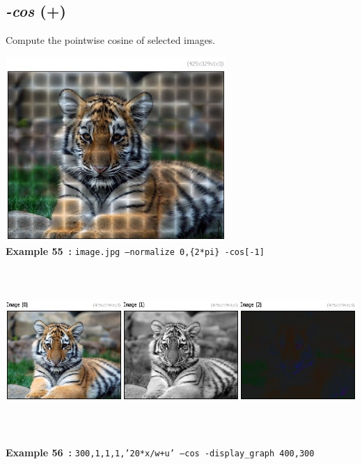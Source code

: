 \documentclass[a4paper,11pt,twoside]{book}
\begin{document}
\subsection{\emph{-cos} (+)}\vspace*{-0.5em}
Compute the pointwise cosine of selected images.
\begin{center}\includegraphics[keepaspectratio=true,height=7cm,width=\textwidth]{img/gmic_def55.jpg}\\
{\footnotesize \textbf{Example 55~:} \texttt{image.jpg --normalize 0,\{2*pi\} -cos[-1]}}
\\\includegraphics[keepaspectratio=true,height=7cm,width=\textwidth]{img/gmic_def56.jpg}\\
{\footnotesize \textbf{Example 56~:} \texttt{300,1,1,1,'20*x/w+u' --cos -display\_graph 400,300}}
\end{center}
\end{document}
